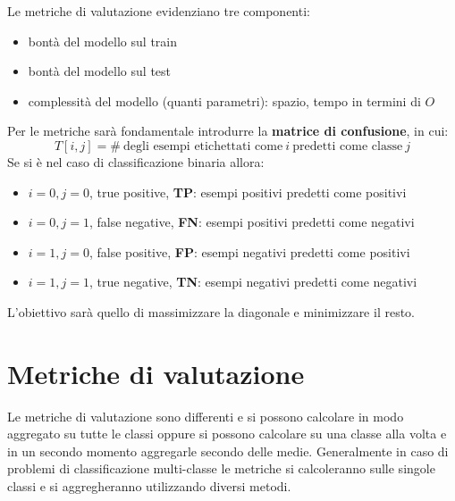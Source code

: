 Le metriche di valutazione evidenziano tre componenti:
\begin{itemize}
    \item bontà del modello sul train
    \item bontà del modello sul test
    \item complessità del modello (quanti parametri): spazio, tempo in termini
          di $O$
\end{itemize}
Per le metriche sarà fondamentale introdurre la \textbf{matrice di confusione},
in cui:
\begin{equation}
    T[i,j] = \# \ \text{degli esempi etichettati come} \ i \ \text{predetti come
        classe} \ j
\end{equation}
Se si è nel caso di classificazione binaria allora:
\begin{itemize}
    \item $i=0, j=0$, true positive, \textbf{TP}: esempi positivi predetti come
          positivi
    \item $i=0, j=1$, false negative, \textbf{FN}: esempi positivi predetti come
          negativi
    \item $i=1, j=0$, false positive, \textbf{FP}: esempi negativi predetti come
          positivi
    \item $i=1, j=1$, true negative, \textbf{TN}: esempi negativi predetti come
          negativi
\end{itemize}
L'obiettivo sarà quello di massimizzare la diagonale e minimizzare il resto.
\section{Metriche di valutazione}
Le metriche di valutazione sono differenti e si possono calcolare in modo aggregato
su tutte le classi oppure si possono calcolare su una classe alla volta e in un
secondo momento aggregarle secondo delle medie. Generalmente in caso di problemi
di classificazione multi-classe le metriche si calcoleranno sulle singole classi e
si aggregheranno utilizzando diversi metodi.


